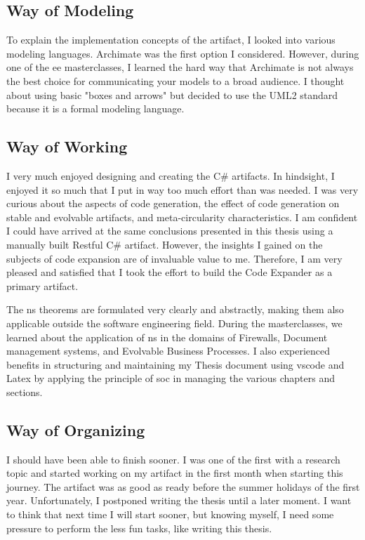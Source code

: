 \subsection{Way of Modeling}

To explain the implementation concepts of the artifact, I looked into various modeling
languages. Archimate was the first option I considered. However, during one of the \gls{ee}
masterclasses, I learned the hard way that Archimate is not always the best choice for
communicating your models to a broad audience. I thought about using basic "boxes and
arrows" but decided to use the UML2 standard because it is a formal modeling language.

\subsection{Way of Working}

I very much enjoyed designing and creating the C\# artifacts. In hindsight, I enjoyed it
so much that I put in way too much effort than was needed. I was very curious about the
aspects of code generation, the effect of code generation on stable and evolvable
artifacts, and meta-circularity characteristics. I am confident I could have arrived at
the same conclusions presented in this thesis using a manually built Restful C\# artifact.
However, the insights I gained on the subjects of code expansion are of invaluable value
to me. Therefore, I am very pleased and satisfied that I took the effort to build the Code
Expander as a primary artifact. 

The \gls{ns} theorems are formulated very clearly and abstractly, making them also
applicable outside the software engineering field. During the masterclasses, we learned
about the application of \gls{ns} in the domains of Firewalls, Document management
systems, and Evolvable Business Processes. I also experienced benefits in structuring and
maintaining my Thesis document using \gls{vscode} and Latex by applying the principle of
\gls{soc} in managing the various chapters and sections. 

\subsection{Way of Organizing}

I should have been able to finish sooner. I was one of the first with a research topic and
started working on my artifact in the first month when starting this journey. The artifact
was as good as ready before the summer holidays of the first year. Unfortunately, I
postponed writing the thesis until a later moment. I want to think that next time I will
start sooner, but knowing myself, I need some pressure to perform the less fun tasks, like
writing this thesis.

